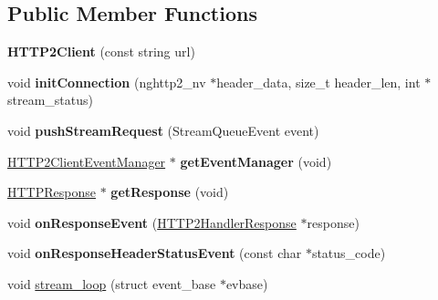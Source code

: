 \subsection*{Public Member Functions}
\begin{DoxyCompactItemize}
\item 
\mbox{\label{classNetwork_1_1HTTP2_1_1HTTP2Client_a29102db8089b67719318850c187a9461}} 
{\bfseries H\+T\+T\+P2\+Client} (const string url)
\item 
\mbox{\label{classNetwork_1_1HTTP2_1_1HTTP2Client_af1623f17ea95731422d9f1d3b30bacc3}} 
void {\bfseries init\+Connection} (nghttp2\+\_\+nv $\ast$header\+\_\+data, size\+\_\+t header\+\_\+len, int $\ast$stream\+\_\+status)
\item 
\mbox{\label{classNetwork_1_1HTTP2_1_1HTTP2Client_a9c27847775264d7a22a3bfb521c6cb9e}} 
void {\bfseries push\+Stream\+Request} (Stream\+Queue\+Event event)
\item 
\mbox{\label{classNetwork_1_1HTTP2_1_1HTTP2Client_a3c7c129cb3df6bd54c08ece2cfa47a9e}} 
\hyperlink{classNetwork_1_1HTTP2_1_1HTTP2ClientEventManager}{H\+T\+T\+P2\+Client\+Event\+Manager} $\ast$ {\bfseries get\+Event\+Manager} (void)
\item 
\mbox{\label{classNetwork_1_1HTTP2_1_1HTTP2Client_afa6dd0f850970813f0d4727ce89a68cc}} 
\hyperlink{classNetwork_1_1HTTP_1_1HTTPResponse}{H\+T\+T\+P\+Response} $\ast$ {\bfseries get\+Response} (void)
\item 
\mbox{\label{classNetwork_1_1HTTP2_1_1HTTP2Client_a13d1a42037119b5cb0dfb34c47beb9ef}} 
void {\bfseries on\+Response\+Event} (\hyperlink{structNetwork_1_1HTTP2_1_1HTTP2HandlerResponse}{H\+T\+T\+P2\+Handler\+Response} $\ast$response)
\item 
\mbox{\label{classNetwork_1_1HTTP2_1_1HTTP2Client_af3f0eae097815ff7c1c706dae9934382}} 
void {\bfseries on\+Response\+Header\+Status\+Event} (const char $\ast$status\+\_\+code)
\item 
void \hyperlink{classNetwork_1_1HTTP2_1_1HTTP2Client_a5c5cd10569102998104f2124a3c7a119}{stream\+\_\+loop} (struct event\+\_\+base $\ast$evbase)

\end{DoxyCompactItemize}
